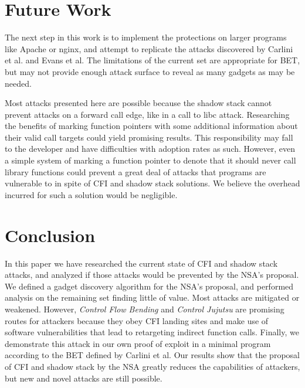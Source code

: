 \documentclass[conference,compsoc]{IEEEtran}
\begin{document}
\section{Future Work} \label{sec:future}

The next step in this work is to implement the protections on larger programs like Apache or nginx, and attempt to replicate the attacks discovered by Carlini et al.\cite{carlini} and Evans et al.\cite{evans} The limitations of the current set are appropriate for BET, but may not provide enough attack surface to reveal as many gadgets as may be needed.

Most attacks presented here are possible because the shadow stack cannot prevent attacks on a forward call edge, like in a call to libc attack. Researching the benefits of marking function pointers with some additional information about their valid call targets could yield promising results. This responsibility may fall to the developer and have difficulties with adoption rates as such. However, even a simple system of marking a function pointer to denote that it should never call library functions could prevent a great deal of attacks that programs are vulnerable to in spite of CFI and shadow stack solutions. We believe the overhead incurred for such a solution would be negligible.

\section{Conclusion} \label{sec:conclusion}

In this paper we have researched the current state of CFI and shadow stack attacks, and analyzed if those attacks would be prevented by the NSA's proposal. We defined a gadget discovery algorithm for the NSA's proposal, and performed analysis on the remaining set finding little of value. Most attacks are mitigated or weakened. However, \emph{Control Flow Bending}\cite{carlini} and \emph{Control Jujutsu}\cite{evans} are promising routes for attackers because they obey CFI landing sites and make use of software vulnerabilities that lead to retargeting indirect function calls. Finally, we demonstrate this attack in our own proof of exploit in a minimal program according to the BET \cite{carlini} defined by Carlini et al. Our results show that the proposal of CFI and shadow stack by the NSA greatly reduces the capabilities of attackers, but new and novel attacks are still possible.



\end{document}
